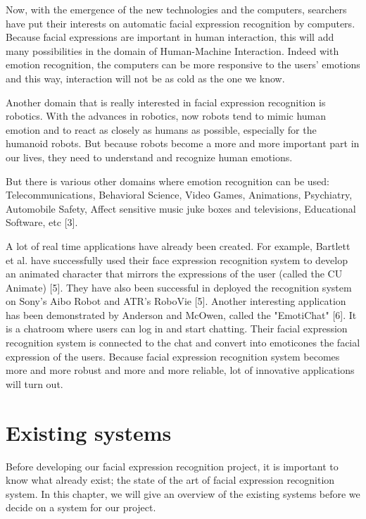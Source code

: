 Now, with the emergence of the new technologies and the computers, searchers have put their interests on automatic facial expression recognition by computers. Because facial expressions are important in human interaction, this will add many possibilities in the domain of Human-Machine Interaction. Indeed with emotion recognition, the computers can be more responsive to the users' emotions and this way, interaction will not be as cold as the one we know. 

Another domain that is really interested in facial expression recognition is robotics. With the advances in robotics, now robots tend to mimic human emotion and to react as closely as humans as possible, especially for the humanoid robots. But because robots become a more and more important part in our lives, they need to understand and recognize human emotions.

But there is various other domains where emotion recognition can be used: Telecommunications, Behavioral Science, Video Games, Animations, Psychiatry, Automobile Safety, Affect sensitive music juke boxes and televisions, Educational Software, etc [3].

A lot of real time applications have already been created. For example, Bartlett et al. have successfully used their face expression recognition system to develop an animated character that mirrors the expressions of the user (called the CU Animate) [5]. They have also been successful in deployed the recognition system on Sony's Aibo Robot and ATR's RoboVie [5]. Another interesting application has been demonstrated by Anderson and McOwen, called the "EmotiChat" [6]. It is a chatroom where users can log in and start chatting. Their facial expression recognition system is connected to the chat and convert into emoticones the facial expression of the users. Because facial expression recognition system becomes more and more robust and more and more reliable, lot of innovative applications will turn out.

\chapter{Existing systems}

Before developing our facial expression recognition project, it is important to know what already exist; the state of the art of facial expression recognition system. In this chapter, we will give an overview of the existing systems before we decide on a system for our project.
